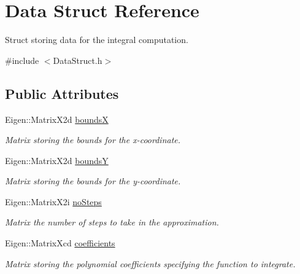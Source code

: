 \hypertarget{struct_data}{}\section{Data Struct Reference}
\label{struct_data}


Struct storing data for the integral computation.  




{\ttfamily \#include $<$Data\+Struct.\+h$>$}

\subsection*{Public Attributes}
\begin{DoxyCompactItemize}
\item 
\mbox{\label{struct_data_a5d52cb2b68c752fa8b74b86ccb1d7e3d}} 
Eigen\+::\+Matrix\+X2d \hyperlink{struct_data_a5d52cb2b68c752fa8b74b86ccb1d7e3d}{boundsX}
\begin{DoxyCompactList}\small\item\em Matrix storing the bounds for the x-\/coordinate. \end{DoxyCompactList}\item 
\mbox{\label{struct_data_aa34a405b70244ad387719f8d38de51ed}} 
Eigen\+::\+Matrix\+X2d \hyperlink{struct_data_aa34a405b70244ad387719f8d38de51ed}{boundsY}
\begin{DoxyCompactList}\small\item\em Matrix storing the bounds for the y-\/coordinate. \end{DoxyCompactList}\item 
\mbox{\label{struct_data_a97a70b84170c9d1e46705fc5a8e1db20}} 
Eigen\+::\+Matrix\+X2i \hyperlink{struct_data_a97a70b84170c9d1e46705fc5a8e1db20}{no\+Steps}
\begin{DoxyCompactList}\small\item\em Matrix the number of steps to take in the approximation. \end{DoxyCompactList}\item 
\mbox{\label{struct_data_aa8aaf26f991decdf85559d5fa417f520}} 
Eigen\+::\+Matrix\+Xcd \hyperlink{struct_data_aa8aaf26f991decdf85559d5fa417f520}{coefficients}
\begin{DoxyCompactList}\small\item\em Matrix storing the polynomial coefficients specifying the function to integrate. \end{DoxyCompactList}\item 

\end{DoxyCompactItemize}
